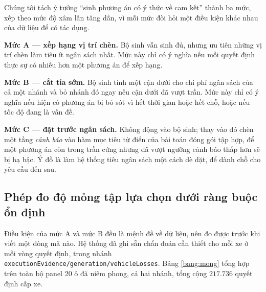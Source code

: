 Chúng tôi tách ý tưởng ``sinh phương án có ý thức về cam kết'' thành ba mức, xếp theo mức độ
xâm lấn tăng dần, vì mỗi mức đòi hỏi một điều kiện khác nhau của dữ liệu để có tác dụng.

\textbf{Mức A --- xếp hạng vị trí chèn.} Bộ sinh vẫn sinh đủ, nhưng ưu tiên những vị trí chèn
làm tiêu ít ngân sách nhất. Mức này chỉ có ý nghĩa nếu mỗi quyết định thực sự có nhiều hơn một
phương án để xếp hạng.

\textbf{Mức B --- cắt tỉa sớm.} Bộ sinh tính một cận dưới cho chi phí ngân sách của cả một
nhánh và bỏ nhánh đó ngay nếu cận dưới đã vượt trần. Mức này chỉ có ý nghĩa nếu hiện có phương
án bị bỏ sót vì hết thời gian hoặc hết chỗ, hoặc nếu tốc độ đang là vấn đề.

\textbf{Mức C --- đặt trước ngân sách.} Không động vào bộ sinh; thay vào đó chèn một tầng
\emph{cảnh báo} vào hàm mục tiêu từ điển của bài toán đóng gói tập hợp, để một phương án còn
trong trần cứng nhưng đã vượt ngưỡng cảnh báo thấp hơn sẽ bị hạ bậc. Ý đồ là làm hệ thống tiêu
ngân sách một cách dè dặt, để dành chỗ cho yêu cầu đến sau.

\subsection{Phép đo độ mỏng tập lựa chọn dưới ràng buộc ổn định}

Điều kiện của mức A và mức B đều là mệnh đề về dữ liệu, nên đo được trước khi viết một dòng mã
nào. Hệ thống đã ghi sẵn chẩn đoán cần thiết cho mỗi xe ở mỗi vòng quyết định, trong nhánh
\texttt{executionEvidence/generation/vehicleLosses}. Bảng \ref{bang:mong} tổng hợp trên toàn bộ
panel 20 ô đã niêm phong, cả hai nhánh, tổng cộng $217.736$ quyết định cấp xe.

